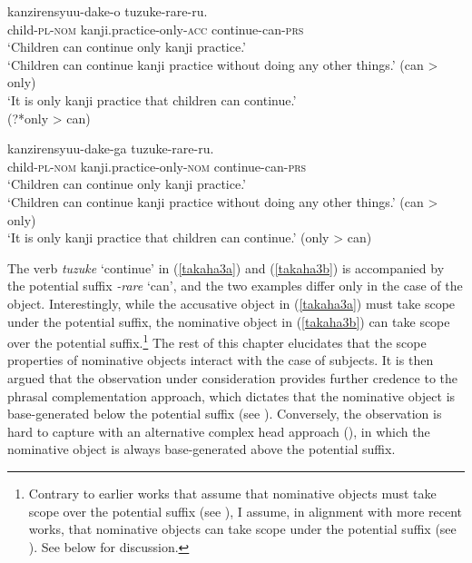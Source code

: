 \documentclass[output=paper]{langscibook}
\begin{document}
\begin{exe}
\ex 

\begin{xlist}

\ex \label{takaha3a}
 {kanzirensyuu-dake-o} {tuzuke-rare-ru.}\\
	child-\textsc{pl}-\textsc{nom}       kanji.practice-only-\textsc{acc} continue-can-\textsc{prs}\\
\glt ‘Children can continue only kanji practice.’\\
	‘Children can continue kanji practice without doing any other things.’ (can \textgreater{} only)\\
 	`It is only kanji practice that children can continue.’\\
(?*only \textgreater{} can)

\ex \label{takaha3b}
 {kanzirensyuu-dake-ga} {tuzuke-rare-ru.}\\
	child-\textsc{pl}-\textsc{nom}       kanji.practice-only-\textsc{nom} continue-can-\textsc{prs}\\
\glt `Children can continue only kanji practice.’\\
`Children can continue kanji practice without doing any other things.' (can \textgreater{} only)\\
`It is only kanji practice that children can continue.’ (only \textgreater{} can)

\end{xlist}
\end{exe}

The verb \emph{tuzuke} ‘continue’ in (\ref{takaha3a}) and (\ref{takaha3b}) is accompanied by the potential suffix \emph{-rare} ‘can’, and the two examples differ only in the case of the object. Interestingly, while the accusative object in (\ref{takaha3a}) must take scope under the potential suffix, the nominative object in (\ref{takaha3b}) can take scope over the potential suffix.\footnote{Contrary to earlier works that assume that nominative objects must take scope over the potential suffix (see \citealt{Tada1992, Koizumi1998, SaitoHoshi1998, Takano2003}), I assume, in alignment with more recent works, that nominative objects can take scope under the potential suffix (see \citealt{nomura2005, Koizumi2008, takahashi2011, FunakoshiTakahashi2014, ochisaruwatari2014a, kasai2018}). See below for discussion.} The rest of this chapter elucidates that the scope properties of nominative objects interact with the case of subjects. It is then argued that the observation under consideration provides further credence to the phrasal complementation approach, which dictates that the nominative object is base-generated below the potential suffix (see \citealt{wurmbrand2001, bobaljikwurmbrand2005,bobaljikwurmbrand2007, nomura2005, Takano2011, FunakoshiTakahashi2014, shimamurawurmbrand2014}). Conversely, the observation is hard to capture with an alternative complex head approach (\citealt{SaitoHoshi1998}), in which the nominative object is always base-generated above the potential suffix.
\end{document}
